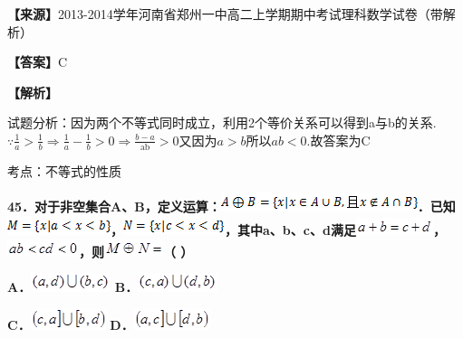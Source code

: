 \documentclass[
]{article}
\begin{document}
\textbf{【来源】}2013-2014学年河南省郑州一中高二上学期期中考试理科数学试卷（带解析）

\textbf{【答案】}C

\textbf{【解析】}

试题分析：因为两个不等式同时成立，利用2个等价关系可以得到a与b的关系.\(\because\frac{1}{a} > \frac{1}{b} \Rightarrow \frac{1}{a} - \frac{1}{b} > 0 \Rightarrow \frac{b - a}{\text{ab}} > 0\)又因为\(a > b\)所以\(ab < 0\).故答案为C

考点：不等式的性质

\textbf{45．对于非空集合A、B，定义运算：}\includegraphics[width=2.26073in,height=0.21878in]{Fig//media/image460.png}\textbf{．已知}\includegraphics[width=1.18767in,height=0.21878in]{Fig//media/image461.png}\textbf{，}\includegraphics[width=1.16683in,height=0.21878in]{Fig//media/image462.png}\textbf{，其中a、b、c、d满足}\includegraphics[width=0.88554in,height=0.19794in]{Fig//media/image463.png}\textbf{，}\includegraphics[width=0.82303in,height=0.19794in]{Fig//media/image464.png}\textbf{，则}\includegraphics[width=0.67718in,height=0.19794in]{Fig//media/image465.png}\textbf{（
）}

\textbf{A．}\includegraphics[width=0.91679in,height=0.21878in]{Fig//media/image466.png}
\textbf{B．}\includegraphics[width=0.91679in,height=0.21878in]{Fig//media/image467.png}

\textbf{C．}\includegraphics[width=0.8647in,height=0.23962in]{Fig//media/image468.png}
\textbf{D．}\includegraphics[width=0.8647in,height=0.23962in]{Fig//media/image469.png}
\end{document}
